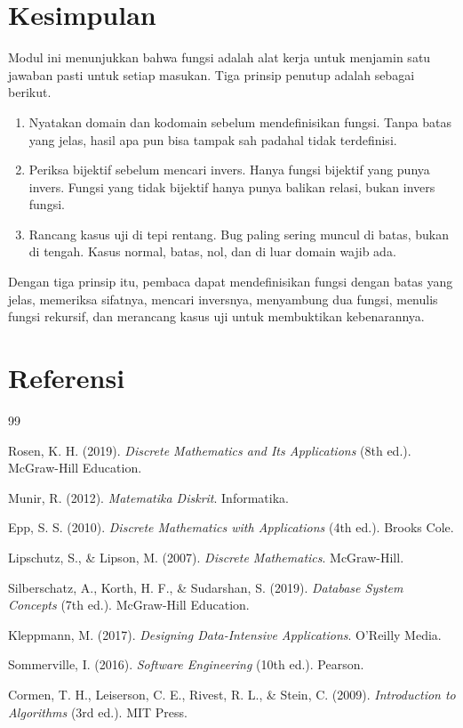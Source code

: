 \documentclass[11pt,a4paper]{article}
\begin{document}
\section{Kesimpulan}

Modul ini menunjukkan bahwa fungsi adalah alat kerja untuk menjamin satu jawaban pasti untuk setiap masukan. Tiga prinsip penutup adalah sebagai berikut.

\begin{enumerate}
	\item Nyatakan domain dan kodomain sebelum mendefinisikan fungsi. Tanpa batas yang jelas, hasil apa pun bisa tampak sah padahal tidak terdefinisi.
	\item Periksa bijektif sebelum mencari invers. Hanya fungsi bijektif yang punya invers. Fungsi yang tidak bijektif hanya punya balikan relasi, bukan invers fungsi.
	\item Rancang kasus uji di tepi rentang. Bug paling sering muncul di batas, bukan di tengah. Kasus normal, batas, nol, dan di luar domain wajib ada.
\end{enumerate}

Dengan tiga prinsip itu, pembaca dapat mendefinisikan fungsi dengan batas yang jelas, memeriksa sifatnya, mencari inversnya, menyambung dua fungsi, menulis fungsi rekursif, dan merancang kasus uji untuk membuktikan kebenarannya.

\newpage
\section*{Referensi}

\begin{thebibliography}{99}

	Rosen, K. H. (2019).
	\textit{Discrete Mathematics and Its Applications} (8th ed.).
	McGraw-Hill Education.

	Munir, R. (2012).
	\textit{Matematika Diskrit}.
	Informatika.

	Epp, S. S. (2010).
	\textit{Discrete Mathematics with Applications} (4th ed.).
	Brooks Cole.

	Lipschutz, S., \& Lipson, M. (2007).
	\textit{Discrete Mathematics}.
	McGraw-Hill.

	Silberschatz, A., Korth, H. F., \& Sudarshan, S. (2019).
	\textit{Database System Concepts} (7th ed.).
	McGraw-Hill Education.

	Kleppmann, M. (2017).
	\textit{Designing Data-Intensive Applications}.
	O'Reilly Media.

	Sommerville, I. (2016).
	\textit{Software Engineering} (10th ed.).
	Pearson.

	Cormen, T. H., Leiserson, C. E., Rivest, R. L., \& Stein, C. (2009).
	\textit{Introduction to Algorithms} (3rd ed.).
	MIT Press.

\end{thebibliography}
\end{document}
